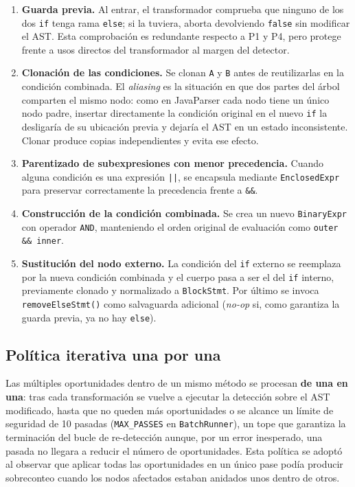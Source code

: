 \begin{enumerate}
    \item \textbf{Guarda previa.}
    Al entrar, el transformador comprueba que ninguno de los dos \lstinline|if| tenga rama \lstinline|else|; si la tuviera, aborta devolviendo \lstinline|false| sin modificar el AST. Esta comprobación es redundante respecto a P1 y P4, pero protege frente a usos directos del transformador al margen del detector.

    \item \textbf{Clonación de las condiciones.}
    Se clonan \lstinline|A| y \lstinline|B| antes de reutilizarlas en la
    condición combinada. El \emph{aliasing} es la situación en que dos partes del
    árbol comparten el mismo nodo: como en JavaParser cada nodo tiene un único
    nodo padre, insertar directamente la condición original en el nuevo
    \lstinline|if| la desligaría de su ubicación previa y dejaría el AST en un
    estado inconsistente. Clonar produce copias independientes y evita ese efecto.

    \item \textbf{Parentizado de subexpresiones con menor precedencia.}
    Cuando alguna condición es una expresión \lstinline=||=, se encapsula mediante \lstinline|EnclosedExpr| para preservar correctamente la precedencia frente a \lstinline|&&|.

    \item \textbf{Construcción de la condición combinada.}
    Se crea un nuevo \lstinline|BinaryExpr| con operador \lstinline|AND|, manteniendo el orden original de evaluación como \lstinline|outer && inner|.

    \item \textbf{Sustitución del nodo externo.}
    La condición del \lstinline|if| externo se reemplaza por la nueva condición combinada y el cuerpo pasa a ser el del \lstinline|if| interno, previamente clonado y normalizado a \lstinline|BlockStmt|. Por último se invoca \lstinline|removeElseStmt()| como salvaguarda adicional (\emph{no-op} si, como garantiza la guarda previa, ya no hay \lstinline|else|).
\end{enumerate}
\subsection{Política iterativa una por una}
\label{sec:one-at-a-time}

Las múltiples oportunidades dentro de un mismo método se procesan \textbf{de una en una}: tras cada transformación se vuelve a ejecutar la detección sobre el AST modificado, hasta que no queden más oportunidades o se alcance un límite de seguridad de 10 pasadas (\lstinline|MAX_PASSES| en \texttt{BatchRunner}), un tope que garantiza la terminación del bucle de re-detección aunque, por un error inesperado, una pasada no llegara a reducir el número de oportunidades. Esta política se adoptó al observar que aplicar todas las oportunidades en un único pase podía producir sobreconteo cuando los nodos afectados estaban anidados unos dentro de otros.

